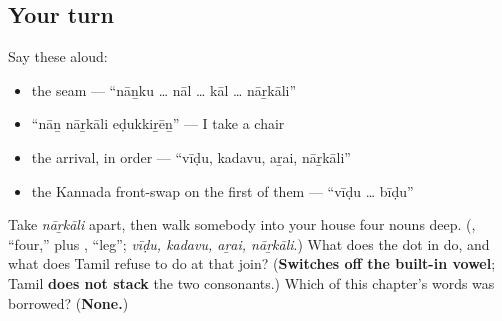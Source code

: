 \subsection*{Your turn}
Say these aloud:

\begin{itemize}
\raggedright
  \item the seam — \textquotedblleft{}nāṉku … nāl … kāl … nāṟkāli\textquotedblright{}
  \item \textquotedblleft{}nāṉ nāṟkāli eḍukkiṟēṉ\textquotedblright{} — I take a chair
  \item the arrival, in order — \textquotedblleft{}vīḍu, kadavu, aṟai, nāṟkāli\textquotedblright{}
  \item the Kannada front-swap on the first of them — \textquotedblleft{}vīḍu … bīḍu\textquotedblright{}
\end{itemize}

\begin{tcolorbox}[breakable,colback=teal!4,colframe=teal!35!black,title={Before you move on}]
Take \emph{nāṟkāli} apart, then walk somebody into your house four nouns deep. (\textbf{}, \textquotedblleft{}four,\textquotedblright{} plus \textbf{}, \textquotedblleft{}leg\textquotedblright{}; \emph{vīḍu, kadavu, aṟai, nāṟkāli}.) What does the dot in \textbf{} do, and what does Tamil refuse to do at that join? (\textbf{Switches off the built-in vowel}; Tamil \textbf{does not stack} the two consonants.) Which of this chapter's words was borrowed? (\textbf{None.})
\end{tcolorbox}
